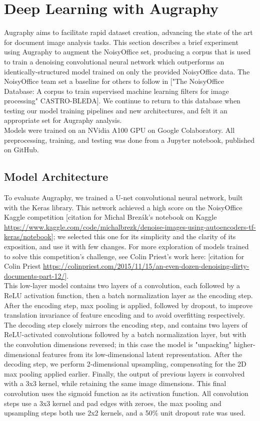 \documentclass[runningheads]{article}
\begin{document}
\section{Deep Learning with Augraphy}
\label{sec:org4d4729d}
Augraphy aims to facilitate rapid dataset creation, advancing the state of the art for document image analysis tasks. This section describes a brief experiment using Augraphy to augment the NoisyOffice set, producing a corpus that is used to train a denoising convolutional neural network which outperforms an identically-structured model trained on only the provided NoisyOffice data. The NoisyOffice team set a baseline for others to follow in ["The NoisyOffice Database: A corpus to train supervised machine learning filters for image processing" CASTRO-BLEDA]. We continue to return to this database when testing our model training pipelines and new architectures, and felt it an appropriate set for Augraphy analysis.\\

Models were trained on an NVidia A100 GPU on Google Colaboratory. All preprocessing, training, and testing was done from a Jupyter notebook, published on GitHub.

\subsection{Model Architecture}
\label{sec:org83264cc}
To evaluate Augraphy, we trained a U-net convolutional neural network, built with the Keras library. This network achieved a high score on the NoisyOffice Kaggle competition [citation for Michal Brezák's notebook on Kaggle \url{https://www.kaggle.com/code/michalbrezk/denoise-images-using-autoencoders-tf-keras/notebook}]; we selected this one for its simplicity and the clarity of its exposition, and use it with few changes. For more exploration of models trained to solve this competition's challenge, see Colin Priest's work here: [citation for Colin Priest \url{https://colinpriest.com/2015/11/15/an-even-dozen-denoising-dirty-documents-part-12/}].\\

This low-layer model contains two layers of a convolution, each followed by a ReLU activation function, then a batch normalization layer as the encoding step. After the encoding step, max pooling is applied, followed by dropout, to improve translation invariance of feature encoding and to avoid overfitting respectively. The decoding step closely mirrors the encoding step, and contains two layers of ReLU-activated convolutions followed by a batch normalization layer, but with the convolution dimensions reversed; in this case the model is "unpacking" higher-dimensional features from its low-dimensional latent representation. After the decoding step, we perform 2-dimensional upsampling, compensating for the 2D max pooling applied earlier. Finally, the output of previous layers is convolved with a 3x3 kernel, while retaining the same image dimensions. This final convolution uses the sigmoid function as its activation function. All convolution steps use a 3x3 kernel and pad edges with zeroes, the max pooling and upsampling steps both use 2x2 kernels, and a 50\% unit dropout rate was used.
\end{document}
